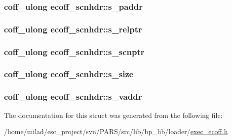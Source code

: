 \label{structecoff__scnhdr_a844726d2153a3eb0075680c12a9828b7}
\hypertarget{structecoff__scnhdr_ae42d0522499118c4e0619d1b7e3a0123}{
\subsubsection[{s\_\-paddr}]{\setlength{\rightskip}{0pt plus 5cm}coff\_\-ulong {\bf ecoff\_\-scnhdr::s\_\-paddr}}}
\label{structecoff__scnhdr_ae42d0522499118c4e0619d1b7e3a0123}
\hypertarget{structecoff__scnhdr_aabb97d798a8099732330465145868664}{
\subsubsection[{s\_\-relptr}]{\setlength{\rightskip}{0pt plus 5cm}coff\_\-ulong {\bf ecoff\_\-scnhdr::s\_\-relptr}}}
\label{structecoff__scnhdr_aabb97d798a8099732330465145868664}
\hypertarget{structecoff__scnhdr_afaf5f4e324e14cf5215871f61d7b65a3}{
\subsubsection[{s\_\-scnptr}]{\setlength{\rightskip}{0pt plus 5cm}coff\_\-ulong {\bf ecoff\_\-scnhdr::s\_\-scnptr}}}
\label{structecoff__scnhdr_afaf5f4e324e14cf5215871f61d7b65a3}
\hypertarget{structecoff__scnhdr_ac7e80fc84ba691a6a19e15fe9b2b7975}{
\subsubsection[{s\_\-size}]{\setlength{\rightskip}{0pt plus 5cm}coff\_\-ulong {\bf ecoff\_\-scnhdr::s\_\-size}}}
\label{structecoff__scnhdr_ac7e80fc84ba691a6a19e15fe9b2b7975}
\hypertarget{structecoff__scnhdr_a175daaf37629fc3f7009df00226bfe8c}{
\subsubsection[{s\_\-vaddr}]{\setlength{\rightskip}{0pt plus 5cm}coff\_\-ulong {\bf ecoff\_\-scnhdr::s\_\-vaddr}}}
\label{structecoff__scnhdr_a175daaf37629fc3f7009df00226bfe8c}


The documentation for this struct was generated from the following file:\begin{DoxyCompactItemize}
\item 
/home/milad/esc\_\-project/svn/PARS/src/lib/bp\_\-lib/loader/\hyperlink{exec__ecoff_8h}{exec\_\-ecoff.h}\end{DoxyCompactItemize}
